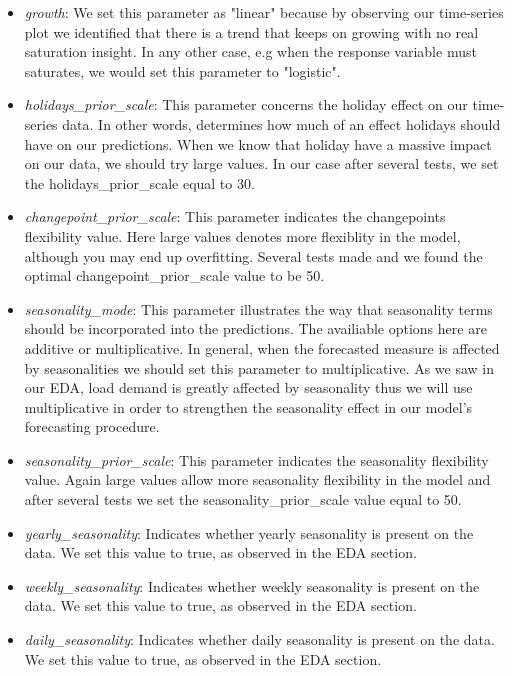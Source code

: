 \begin{itemize}
    \item \textit{growth}: We set this parameter as "linear" because by observing our time-series plot we identified that there is a trend that keeps on growing with no real saturation insight. In any other case, e.g when the response variable must saturates, we would set this parameter to "logistic".
    \item \textit{holidays\_prior\_scale}: This parameter concerns the holiday effect on our time-series data. In other words, determines how much of an effect holidays should have on our predictions. When we know that holiday have a massive impact on our data, we should try large values. In our case after several tests, we set the holidays\_prior\_scale equal to 30.
    \item \textit{changepoint\_prior\_scale}: This parameter indicates the changepoints flexibility value. Here large values denotes more flexiblity in the model, although you may end up overfitting. Several tests made and we found the optimal changepoint\_prior\_scale value to be 50.
    \item \textit{seasonality\_mode}: This parameter illustrates the way that seasonality terms should be incorporated into the predictions. The availiable options here are additive or multiplicative. In general, when the forecasted measure is affected by seasonalities we should set this parameter to multiplicative. As we saw in our EDA, load demand is greatly affected by seasonality thus we will use multiplicative in order to strengthen the seasonality effect in our model's forecasting procedure.
    \item \textit{seasonality\_prior\_scale}: This parameter indicates the seasonality flexibility value. Again large values allow more seasonality flexibility in the model and after several tests we set the seasonality\_prior\_scale value equal to 50.
     \item \textit{yearly\_seasonality}: Indicates whether yearly seasonality is present on the data. We set this value to true, as observed in the EDA section.
     \item \textit{weekly\_seasonality}: Indicates whether weekly seasonality is present on the data. We set this value to true, as observed in the EDA section.
     \item \textit{daily\_seasonality}: Indicates whether daily seasonality is present on the data. We set this value to true, as observed in the EDA section.
\end{itemize}{}
